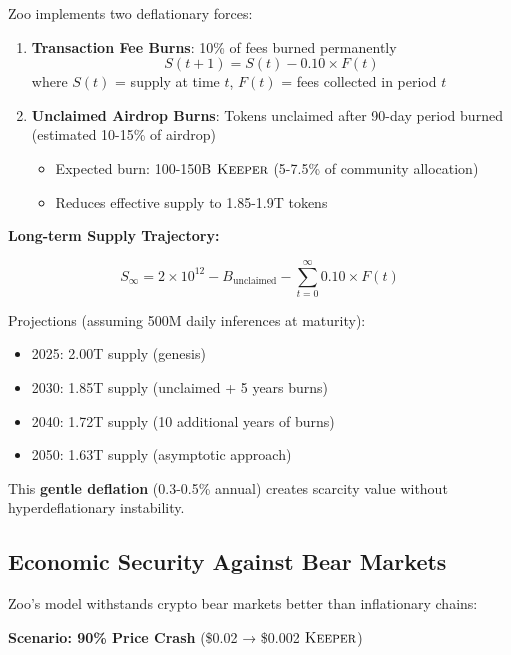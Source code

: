 \documentclass[11pt,letterpaper]{article}
\theoremstyle{definition}
\theoremstyle{remark}
\newcommand{\KEEPER}{\textsc{Keeper}}
\begin{document}
Zoo implements two deflationary forces:

\begin{enumerate}
\item \textbf{Transaction Fee Burns}: 10\% of fees burned permanently
    \begin{equation}
    S(t+1) = S(t) - 0.10 \times F(t)
    \end{equation}
    where $S(t)$ = supply at time $t$, $F(t)$ = fees collected in period $t$

\item \textbf{Unclaimed Airdrop Burns}: Tokens unclaimed after 90-day period burned (estimated 10-15\% of airdrop)
    \begin{itemize}
    \item Expected burn: 100-150B $\KEEPER$ (5-7.5\% of community allocation)
    \item Reduces effective supply to 1.85-1.9T tokens
    \end{itemize}
\end{enumerate}

\textbf{Long-term Supply Trajectory:}

\begin{equation}
S_{\infty} = 2 \times 10^{12} - B_{\text{unclaimed}} - \sum_{t=0}^{\infty} 0.10 \times F(t)
\end{equation}

Projections (assuming 500M daily inferences at maturity):
\begin{itemize}
\item 2025: 2.00T supply (genesis)
\item 2030: 1.85T supply (unclaimed + 5 years burns)
\item 2040: 1.72T supply (10 additional years of burns)
\item 2050: 1.63T supply (asymptotic approach)
\end{itemize}

This \textbf{gentle deflation} (0.3-0.5\% annual) creates scarcity value without hyperdeflationary instability.

\subsection{Economic Security Against Bear Markets}

Zoo's model withstands crypto bear markets better than inflationary chains:

\textbf{Scenario: 90\% Price Crash} (\$0.02 → \$0.002 $\KEEPER$)
\end{document}

